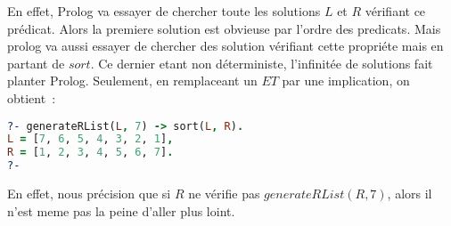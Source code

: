 En effet, Prolog va essayer de chercher toute les solutions $L$ et $R$ vérifiant ce
prédicat. Alors la premiere solution est obvieuse par l'ordre des predicats. Mais
prolog va aussi essayer de chercher des solution vérifiant cette propriéte mais en partant
de $sort$. Ce dernier etant non déterministe, l'infinitée de solutions fait planter
Prolog. Seulement, en remplaceant un $ET$ par une implication, on obtient~:
\begin{lstlisting}[language=Prolog,frame=single]
?- generateRList(L, 7) -> sort(L, R).
L = [7, 6, 5, 4, 3, 2, 1],
R = [1, 2, 3, 4, 5, 6, 7].
?-
\end{lstlisting}
En effet, nous précision que si $R$ ne vérifie pas $generateRList(R, 7)$, alors
il n'est meme pas la peine d'aller plus loint.
